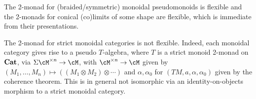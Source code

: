 \documentclass[a4paper,11pt,oneside,openany]{scrbook}
\begin{document}
\begin{exmp}
    The 2-monad for (braided/symmetric) monoidal pseudomonoids is flexible and
    the 2-monads for conical (co)limits of some shape are flexible, which is
    immediate from their presentations.
\end{exmp}

\begin{exmp}
    The 2-monad for strict monoidal categories is not flexible. Indeed, each
    monoidal category gives rise to a pseudo $T$-algebra, where $T$ is a strict
    monoid 2-monad on ${\normalfont\textbf{Cat}}$, via $\Sigma\cM^{\times n}\rightarrow\cM$, with
    $\cM^{\times n}\rightarrow\cM$ given by $(M_1,\ldots,M_n)\mapsto((M_1\otimes
    M_2)\otimes\cdots)$ and $\alpha,\alpha_0$ for $(TM,a,\alpha,\alpha_0)$ given
    by the coherence theorem. This is in general not isomorphic via
    an identity-on-objects morphism to a strict monoidal category.
\end{exmp}
\end{document}
